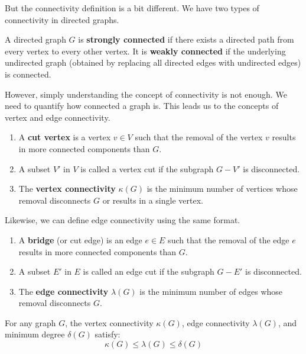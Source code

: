 \documentclass[oneside]{book}
\begin{document}
But the connectivity definition is a bit different. We have two types of connectivity in directed graphs.

\begin{definition}
A directed graph $G$ is \textbf{strongly connected} if there exists a directed path from every vertex to every other vertex. It is \textbf{weakly connected} if the underlying undirected graph (obtained by replacing all directed edges with undirected edges) is connected.
\end{definition}

However, simply understanding the concept of connectivity is not enough. We need to quantify how connected a graph is. This leads us to the concepts of vertex and edge connectivity.

\begin{definition}
\begin{enumerate}
    \item A \textbf{cut vertex} is a vertex $v \in V$ such that the removal of the vertex $v$ results in more connected components than $G$.
    \item A subset $V'$ in $V$ is called a vertex cut if the subgraph $G-V'$ is disconnected.
    \item The \textbf{vertex connectivity} $\kappa(G)$ is the minimum number of vertices whose removal disconnects $G$ or results in a single vertex.
\end{enumerate}
\end{definition}

Likewise, we can define edge connectivity using the same format.

\begin{definition}
\begin{enumerate}
    \item A \textbf{bridge} (or cut edge) is an edge $e \in E$ such that the removal of the edge $e$ results in more connected components than $G$.
    \item A subset $E'$ in $E$ is called an edge cut if the subgraph $G-E'$ is disconnected.
    \item The \textbf{edge connectivity} $\lambda(G)$ is the minimum number of edges whose removal disconnects $G$.
\end{enumerate}
\end{definition}

\begin{theorem}
For any graph $G$, the vertex connectivity $\kappa(G)$, edge connectivity $\lambda(G)$, and minimum degree $\delta(G)$ satisfy:
\[ \kappa(G) \le \lambda(G) \le \delta(G) \]
\end{theorem}
\end{document}
